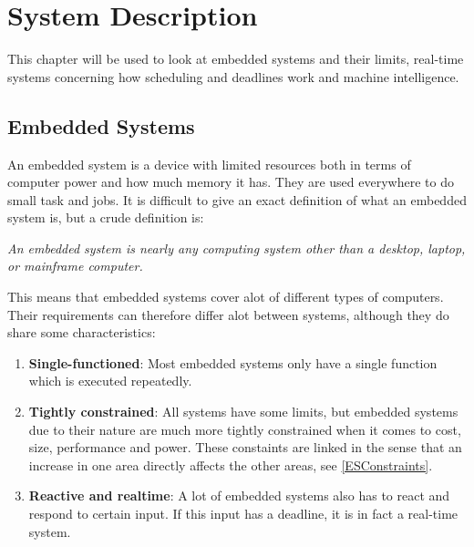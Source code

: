 \chapter{System Description}
This chapter will be used to look at embedded systems and their limits,
real-time systems concerning how scheduling and deadlines work and machine
intelligence.

\section{Embedded Systems}
An embedded system is a device with limited resources both in terms of computer
power and how much memory it has. They are used everywhere to do small task and
jobs. It is difficult to give an exact definition of what an embedded system is,
but a crude definition\citep[ch.1.1]{vahid1999embedded} is:\nl

\textit{An  embedded  system  is  nearly  any computing system other than a desktop,
laptop, or  mainframe  computer.}\nl

This means that embedded systems cover alot of different types of computers.
Their requirements can therefore differ alot between systems, although they do
share some characteristics:

\begin{enumerate}
  \item \textbf{Single-functioned}:  Most embedded systems only have a single
  function which is executed repeatedly.
  \item \textbf{Tightly constrained}: All systems have some limits, but embedded
  systems due to their nature are much more tightly constrained when it comes to
  cost, size, performance and power. These constaints are linked in the sense
  that an increase in one area directly affects the other areas, see
  \autoref{ESConstraints}.
  \item \textbf{Reactive and realtime}: A lot of embedded systems also has to
  react and respond to certain input. If this input has a deadline, it is in
  fact a real-time system.
\end{enumerate}






